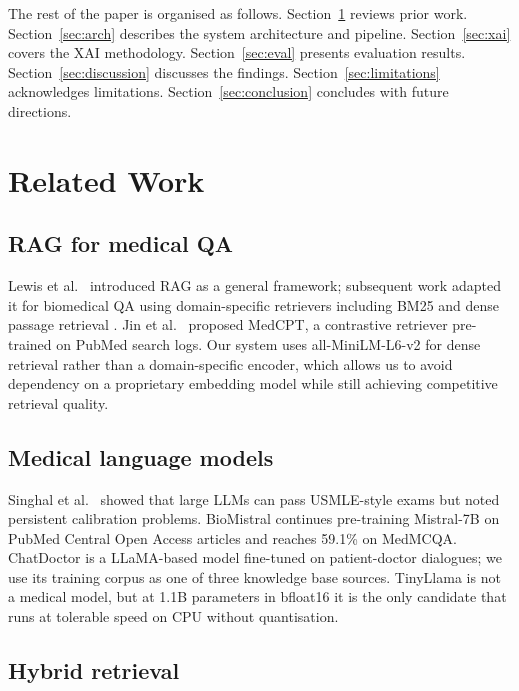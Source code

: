 \documentclass[conference,a4paper]{IEEEtran}
\begin{document}
The rest of the paper is organised as follows.
Section~\ref{sec:related} reviews prior work.
Section~\ref{sec:arch} describes the system architecture and pipeline.
Section~\ref{sec:xai} covers the XAI methodology.
Section~\ref{sec:eval} presents evaluation results.
Section~\ref{sec:discussion} discusses the findings.
Section~\ref{sec:limitations} acknowledges limitations.
Section~\ref{sec:conclusion} concludes with future directions.

\section{Related Work}
\label{sec:related}

\subsection{RAG for medical QA}

Lewis et al.\ \cite{lewis2020rag} introduced RAG as a general
framework; subsequent work adapted it for biomedical QA using
domain-specific retrievers including BM25 \cite{robertson2009bm25}
and dense passage retrieval \cite{karpukhin2020dpr}.
Jin et al.\ \cite{jin2023medcpt} proposed MedCPT, a contrastive
retriever pre-trained on PubMed search logs.
Our system uses all-MiniLM-L6-v2 for dense retrieval rather than
a domain-specific encoder, which allows us to avoid dependency on
a proprietary embedding model while still achieving competitive
retrieval quality.

\subsection{Medical language models}

Singhal et al.\ \cite{singhal2023large} showed that large LLMs can pass
USMLE-style exams but noted persistent calibration problems.
BioMistral \cite{labrak2024biomistral} continues pre-training Mistral-7B
on PubMed Central Open Access articles and reaches 59.1\% on MedMCQA.
ChatDoctor \cite{li2023chatdoctor} is a LLaMA-based model fine-tuned on
patient-doctor dialogues; we use its training corpus as one of three knowledge
base sources.
TinyLlama \cite{zhang2024tinyllama} is not a medical model, but at 1.1B
parameters in bfloat16 it is the only candidate that runs at tolerable
speed on CPU without quantisation.

\subsection{Hybrid retrieval}
\end{document}
